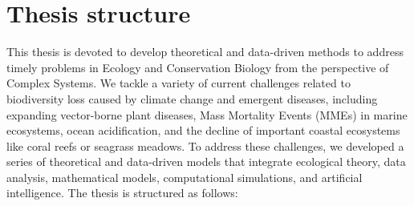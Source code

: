 \section{\label{sec:Thesis structure} Thesis structure}

This thesis is devoted to develop theoretical and data-driven methods to
address timely problems in Ecology and Conservation Biology from the
perspective of Complex Systems. We tackle a variety of current challenges
related to biodiversity loss caused by climate change and emergent diseases,
including expanding vector-borne plant diseases, Mass Mortality Events (MMEs)
in marine ecosystems, ocean acidification, and the decline of important coastal
ecosystems like coral reefs or seagrass meadows. To address these challenges,
we developed a series of theoretical and data-driven models that integrate
ecological theory, data analysis, mathematical models, computational
simulations, and artificial intelligence. The thesis is structured as follows:
